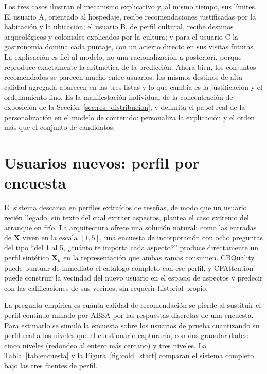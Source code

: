 Los tres casos ilustran el mecanismo explicativo y, al mismo tiempo, sus límites. El
usuario A, orientado al hospedaje, recibe recomendaciones justificadas por la habitación y
la ubicación; el usuario B, de perfil cultural, recibe destinos arqueológicos y coloniales
explicados por la cultura; y para el usuario C la gastronomía domina cada puntaje, con un
acierto directo en sus visitas futuras. La explicación es fiel al modelo, no una
racionalización a posteriori, porque reproduce exactamente la aritmética de la
predicción. Ahora bien, los conjuntos recomendados se parecen mucho entre usuarios: los
mismos destinos de alta calidad agregada aparecen en las tres listas y lo que cambia es la
justificación y el ordenamiento fino. Es la manifestación individual de la concentración
de exposición de la Sección~\ref{sec:res_distribucion}, y delimita el papel real de la
personalización en el modelo de contenido: personaliza la explicación y el orden más que
el conjunto de candidatos.

\section{Usuarios nuevos: perfil por encuesta}\label{sec:res_encuesta}

El sistema descansa en perfiles extraídos de reseñas, de modo que un usuario recién
llegado, sin texto del cual extraer aspectos, plantea el caso extremo del arranque en
frío. La arquitectura ofrece una solución natural: como las entradas de $\mathbf{X}$ viven
en la escala $[1, 5]$, una encuesta de incorporación con ocho preguntas del tipo ``del 1
al 5, ¿cuánto te importa cada aspecto?'' produce directamente un perfil sintético
$\mathbf{X}_u$ en la representación que ambas ramas consumen. CBQuality puede puntuar de
inmediato el catálogo completo con ese perfil, y CFAttention puede construir la vecindad
del nuevo usuario en el espacio de aspectos y predecir con las calificaciones de sus
vecinos, sin requerir historial propio.

La pregunta empírica es cuánta calidad de recomendación se pierde al sustituir el perfil
continuo minado por ABSA por las respuestas discretas de una encuesta. Para estimarlo se
simuló la encuesta sobre los usuarios de prueba cuantizando su perfil real a los niveles
que el cuestionario capturaría, con dos granularidades: cinco niveles (redondeo al entero
más cercano) y tres niveles. La Tabla~\ref{tab:encuesta} y la Figura~\ref{fig:cold_start}
comparan el sistema completo bajo las tres fuentes de perfil.


